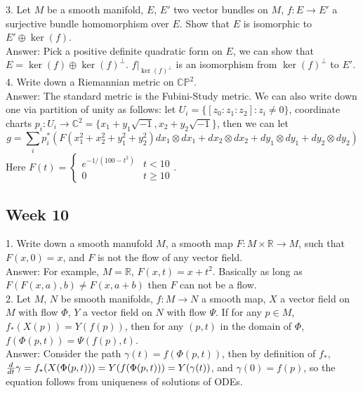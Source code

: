 \documentclass{article}
\theoremstyle{definition}
\begin{document}
3. Let $M$ be a smooth manifold, $E$, $E'$ two vector bundles on $M$, $f: E\rightarrow E'$ a surjective bundle homomorphism over $E$. Show that $E$ is isomorphic to $E'\oplus \ker(f)$.\\

Answer: Pick a positive definite quadratic form on $E$, we can show that $E=\ker(f)\oplus \ker(f)^\perp$. $f|_{\ker(f)^\perp}$ is an isomorphism from $\ker(f)^\perp$ to $E'$.\\

4. Write down a Riemannian metric on $\mathbb{CP}^2$.\\

Answer: The standard metric is the Fubini-Study metric. We can also write down one via partition of unity as follows: let $U_i=\{[z_0:z_1:z_2]: z_i\not=0\}$, coordinate charts $p_i: U_i\rightarrow \mathbb{C}^2=\{x_1+y_1\sqrt{-1}, x_2+y_2\sqrt{-1}\}$, then we can let
\[g=\sum_ip^*_i(F(x_1^2+x_2^2+y_1^2+y_2^2)dx_1\otimes dx_1+dx_2\otimes dx_2+dy_1\otimes dy_1+dy_2\otimes dy_2)\]
Here $F(t)=\begin{cases}e^{-1/(100-t^2)} & t<10\\ 0& t\geq 10\end{cases}$.

\subsection{Week 10}

1. Write down a smooth manufold $M$, a smooth map $F: M\times\mathbb{R}\rightarrow M$, such that $F(x, 0)=x$, and $F$ is not the flow of any vector field.\\

Answer: For example, $M=\mathbb{R}$, $F(x, t)=x+t^2$. Basically as long as $F(F(x, a), b)\not=F(x, a+b)$ then $F$ can not be a flow.\\

2. Let $M$, $N$ be smooth manifolds, $f: M\rightarrow N$ a smooth map, $X$ a vector field on $M$ with flow $\Phi$, $Y$ a vector field on $N$ with flow $\Psi$. If for any $p\in M$, $f_*(X(p))=Y(f(p))$, then for any $(p, t)$ in the domain of $\Phi$, $f(\Phi(p, t))=\Psi(f(p), t)$.\\

Answer: Consider the path $\gamma(t)=f(\Phi(p, t))$, then by definition of $f_*$, ${d\over dt}\gamma=f_*(X(\Phi(p, t)))=Y(f(\Phi(p, t)))=Y(\gamma(t))$, and $\gamma(0)=f(p)$, so the equation follows from uniqueness of solutions of ODEs.\\
\end{document}
